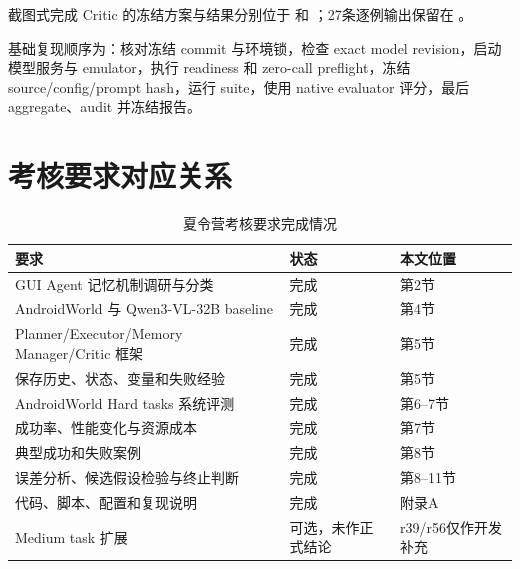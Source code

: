 \documentclass[12pt,a4paper]{ctexart}
\begin{document}
截图式完成 Critic 的冻结方案与结果分别位于
和
；27条逐例输出保留在
。

基础复现顺序为：核对冻结 commit 与环境锁，检查 exact model revision，启动模型服务与 emulator，执行 readiness 和 zero-call preflight，冻结 source/config/prompt hash，运行 suite，使用 native evaluator 评分，最后 aggregate、audit 并冻结报告。

\section{考核要求对应关系}

\begin{table}[H]
    \centering
    \caption{夏令营考核要求完成情况}
    \label{tab:requirements}
    \small
    \begin{tabularx}{\textwidth}{p{6.0cm}p{2.3cm}Y}
        \toprule
        要求 & 状态 & 本文位置 \\
        \midrule
        GUI Agent 记忆机制调研与分类 & 完成 & 第2节 \\
        AndroidWorld 与 Qwen3-VL-32B baseline & 完成 & 第4节 \\
        Planner/Executor/Memory Manager/Critic 框架 & 完成 & 第5节 \\
        保存历史、状态、变量和失败经验 & 完成 & 第5节 \\
        AndroidWorld Hard tasks 系统评测 & 完成 & 第6--7节 \\
        成功率、性能变化与资源成本 & 完成 & 第7节 \\
        典型成功和失败案例 & 完成 & 第8节 \\
        误差分析、候选假设检验与终止判断 & 完成 & 第8--11节 \\
        代码、脚本、配置和复现说明 & 完成 & 附录A \\
        Medium task 扩展 & 可选，未作正式结论 & r39/r56仅作开发补充 \\
        \bottomrule
    \end{tabularx}
\end{table}
\end{document}
